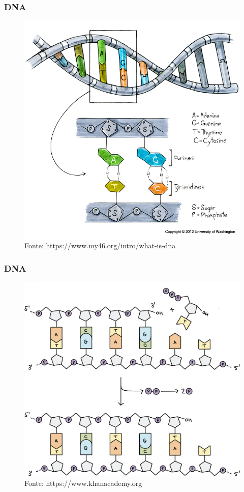 \documentclass{beamer}
\begin{document}
		\begin{frame} \frametitle{DNA}
		\begin{figure}[hbtp]
			\centering
			\includegraphics[scale=0.3]{img/dna02.png}
			\caption{\tiny{Fonte: https://www.my46.org/intro/what-is-dna}}
		\end{figure}
		\end{frame}	
	
		\begin{frame} \frametitle{DNA}
		\begin{figure}[hbtp]
			\centering
			\includegraphics[scale=0.15]{img/dna03.png}
			\caption{\tiny{Fonte: https://www.khanacademy.org}}
		\end{figure}
		\end{frame}		
	
\end{document}
